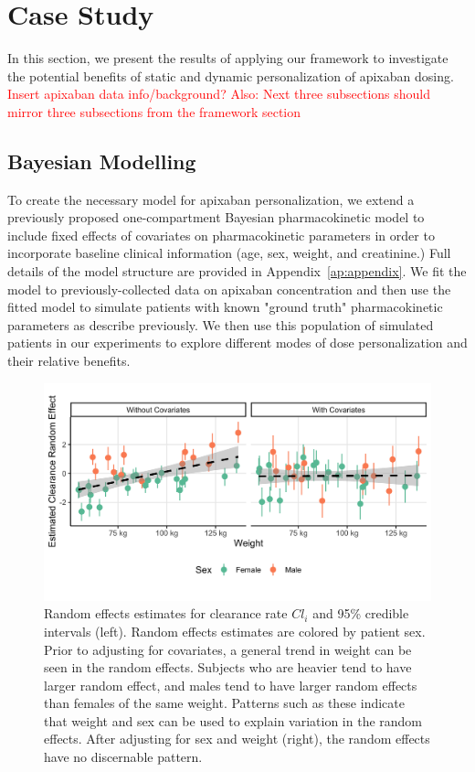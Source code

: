 \section{Case Study}\label{ss:casestudy}

In this section, we present the results of applying our framework to investigate the potential benefits of static and dynamic personalization of apixaban dosing. \textcolor{red}{Insert apixaban data info/background? Also: Next three subsections should mirror three subsections from the framework section}

\subsection{Bayesian Modelling}

To create the necessary model for apixaban personalization, we extend a previously proposed one-compartment Bayesian pharmacokinetic model \cite{pananos2020comparisons} to include fixed effects of covariates on pharmacokinetic parameters in order to incorporate baseline clinical information (age, sex, weight, and creatinine.)  Full details of the model structure are provided in Appendix~\ref{ap:appendix}. We fit the model to previously-collected data on apixaban concentration \cite{tirona2018apixaban} and then use the fitted model to simulate patients with known "ground truth" pharmacokinetic parameters as describe previously. We then use this population of simulated patients in our experiments to explore different modes of dose personalization and their relative benefits.

\begin{figure}
	\centering
	\includegraphics[width=\linewidth]{"figures/random_effects_change.png"}
	\caption{Random effects estimates for clearance rate $ Cl_i $ and 95\% credible intervals (left).  Random effects estimates are colored by patient sex.  Prior to adjusting for covariates, a general trend in weight can be seen in the random effects.  Subjects who are heavier tend to have larger random effect, and males tend to have larger random effects than females of the same weight.  Patterns such as these indicate that weight and sex can be used to explain variation in the random effects.  After adjusting for sex and weight (right), the random effects have no discernable pattern.}
	\label{fig:randomeffectschange}
\end{figure}

